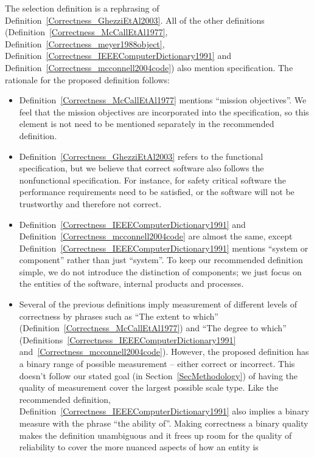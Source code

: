 \documentclass[letterpaper, cleveref]{lipics-v2019}
\theoremstyle{definition}
\begin{document}
The selection definition is a rephrasing of
Definition~\ref{Correctness_GhezziEtAl2003}.  All of the other definitions
(Definition~\ref{Correctness_McCallEtAl1977},
Definition~\ref{Correctness_meyer1988object},
Definition~\ref{Correctness_IEEEComputerDictionary1991} and
Definition~\ref{Correctness_mcconnell2004code}) also mention specification.  The
rationale for the proposed definition follows:

\begin{itemize}
  \item Definition~\ref{Correctness_McCallEtAl1977} mentions ``mission
  objectives''.  We feel that the mission objectives are incorporated into the
  specification, so this element is not need to be mentioned separately in the
  recommended definition.
  \item Definition~\ref{Correctness_GhezziEtAl2003} refers to the functional
  specification, but we believe that correct software also follows the
  nonfunctional specification.  For instance, for safety critical software the
  performance requirements need to be satisfied, or the software will not be
  trustworthy and therefore not correct.
  \item Definition~\ref{Correctness_IEEEComputerDictionary1991} and
  Definition~\ref{Correctness_mcconnell2004code} are almost the same, except
  Definition~\ref{Correctness_IEEEComputerDictionary1991} mentions ``system or
  component'' rather than just ``system''.  To keep our recommended definition
  simple, we do not introduce the distinction of components; we just focus on
  the entities of the software, internal products and processes.
  \item Several of the previous definitions imply measurement of different
  levels of correctness by phrases such as ``The extent to which''
  (Definition~\ref{Correctness_McCallEtAl1977}) and ``The degree to which''
  (Definitions~\ref{Correctness_IEEEComputerDictionary1991}
  and~\ref{Correctness_mcconnell2004code}). However, the proposed definition has
  a binary range of possible measurement -- either correct or incorrect.  This
  doesn't follow our stated goal (in Section~\ref{SecMethodology}) of having the
  quality of measurement cover the largest possible scale type.  Like the
  recommended definition,
  Definition~\ref{Correctness_IEEEComputerDictionary1991} also implies a binary
  measure with the phrase ``the ability of''.  Making correctness a binary
  quality makes the definition unambiguous and it frees up room for the quality
  of reliability to cover the more nuanced aspects of how an entity is

\end{itemize}
\end{document}
